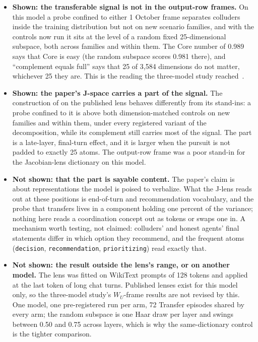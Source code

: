 \documentclass[11pt,a4paper]{article}
\newcommand{\WU}{W_U}
\begin{document}
\begin{itemize}[leftmargin=1.6em,itemsep=0.15em]
\item \textbf{Shown: the transferable signal is not in the output-row frames.} On this model a probe confined to either 1 October frame separates colluders inside the training distribution but not on new scenario families, and with the controls now run it sits at the level of a random fixed 25-dimensional subspace, both across families and within them. The Core number of 0.989 says that Core is easy (the random subspace scores 0.981 there), and ``complement equals full'' says that 25 of 3,584 dimensions do not matter, whichever 25 they are. This is the reading the three-model study reached~\citep{liang2026jspace}.
\item \textbf{Shown: the paper's J-space carries a part of the signal.} The construction of \citet{gurnee2026verbalizable} on the published lens behaves differently from its stand-ins: a probe confined to it is above both dimension-matched controls on new families and within them, under every registered variant of the decomposition, while its complement still carries most of the signal. The part is a late-layer, final-turn effect, and it is larger when the pursuit is not padded to exactly 25 atoms. The output-row frame was a poor stand-in for the Jacobian-lens dictionary on this model.
\item \textbf{Not shown: that the part is sayable content.} The paper's claim is about representations the model is poised to verbalize. What the J-lens reads out at these positions is end-of-turn and recommendation vocabulary, and the probe that transfers lives in a component holding one percent of the variance; nothing here reads a coordination concept out as tokens or swaps one in. A mechanism worth testing, not claimed: colluders' and honest agents' final statements differ in which option they recommend, and the frequent atoms (\texttt{decision}, \texttt{recommendation}, \texttt{prioritizing}) read exactly that.
\item \textbf{Not shown: the result outside the lens's range, or on another model.} The lens was fitted on WikiText prompts of 128 tokens and applied at the last token of long chat turns. Published lenses exist for this model only, so the three-model study's $\WU$-frame results are not revised by this. One model, one pre-registered run per arm, 72 Transfer episodes shared by every arm; the random subspace is one Haar draw per layer and swings between 0.50 and 0.75 across layers, which is why the same-dictionary control is the tighter comparison.
\end{itemize}
\end{document}
